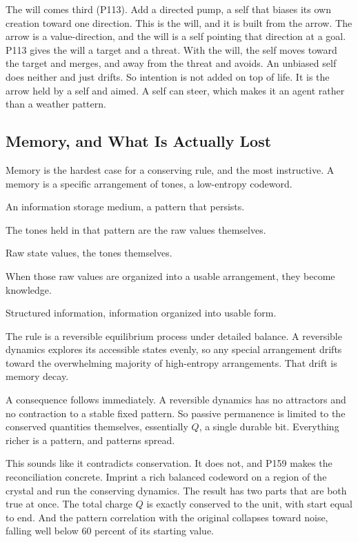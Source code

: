 The will comes third (P113). Add a directed pump, a self that biases its own creation toward one direction. This is the will, and it is built from the arrow. The arrow is a value-direction, and the will is a self pointing that direction at a goal. P113 gives the will a target and a threat. With the will, the self moves toward the target and merges, and away from the threat and avoids. An unbiased self does neither and just drifts. So intention is not added on top of life. It is the arrow held by a self and aimed. A self can steer, which makes it an agent rather than a weather pattern.

\subsection{Memory, and What Is Actually Lost}

Memory is the hardest case for a conserving rule, and the most instructive. A memory is a specific arrangement of tones, a low-entropy codeword.

\begin{definition}[Memory]
An information storage medium, a pattern that persists.
\end{definition}

The tones held in that pattern are the raw values themselves.

\begin{definition}[Information]
Raw state values, the tones themselves.
\end{definition}

When those raw values are organized into a usable arrangement, they become knowledge.

\begin{definition}[Knowledge]
Structured information, information organized into usable form.
\end{definition}
 The rule is a reversible equilibrium process under detailed balance. A reversible dynamics explores its accessible states evenly, so any special arrangement drifts toward the overwhelming majority of high-entropy arrangements. That drift is memory decay.

A consequence follows immediately. A reversible dynamics has no attractors and no contraction to a stable fixed pattern. So passive permanence is limited to the conserved quantities themselves, essentially $Q$, a single durable bit. Everything richer is a pattern, and patterns spread.

This sounds like it contradicts conservation. It does not, and P159 makes the reconciliation concrete. Imprint a rich balanced codeword on a region of the crystal and run the conserving dynamics. The result has two parts that are both true at once. The total charge $Q$ is exactly conserved to the unit, with start equal to end. And the pattern correlation with the original collapses toward noise, falling well below $60$ percent of its starting value.

